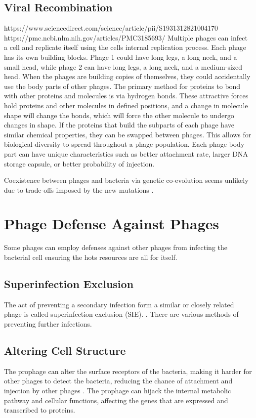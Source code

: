 \subsection{Viral Recombination}
https://www.sciencedirect.com/science/article/pii/S1931312821004170
https://pmc.ncbi.nlm.nih.gov/articles/PMC3185693/
Multiple phages can infect a cell and replicate itself using the cells internal replication process. 
Each phage has its own building blocks. 
Phage 1 could have long legs, a long neck, and a small head, while phage 2 can have long legs, a long neck, and a medium-sized head. 
When the phages are building copies of themselves, they could accidentally use the body parts of other phages. 
The primary method for proteins to bond with other proteins and molecules is via hydrogen bonds. 
These attractive forces hold proteins and other molecules in defined positions, and a change in molecule shape will change the bonds, which will force the other molecule to undergo changes in shape. 
If the proteins that build the subparts of each phage have similar chemical properties, they can be swapped between phages. 
This allows for biological diversity to spread throughout a phage population. 
Each phage body part can have unique characteristics such as better attachment rate, larger DNA storage capsule, or better probability of injection. 

Coexistence between phages and bacteria via genetic co-evolution seems unlikely due to trade-offs imposed by the new mutations \cite{bullOptimalityModelsPhage2006}. 


\section{Phage Defense Against Phages}
Some phages can employ defenses against other phages from infecting the bacterial cell ensuring the hots resources are all for itself. 
\subsection{Superinfection Exclusion}
The act of preventing a secondary infection form a similar or closely related phage is called superinfection exclusion (SIE). \cite{patelAntiphageDefenceInhibition2024}. 
There are various methods of preventing further infections. 
\subsection{Altering Cell Structure}
The prophage can alter the surface receptors of the bacteria, making it harder for other phages to detect the bacteria, reducing the chance of attachment and injection by other phages \cite{bucherPhageMachineSIEence2024}. The prophage can hijack the internal metabolic pathway and cellular functions, affecting the genes that are expressed and transcribed to proteins. 

